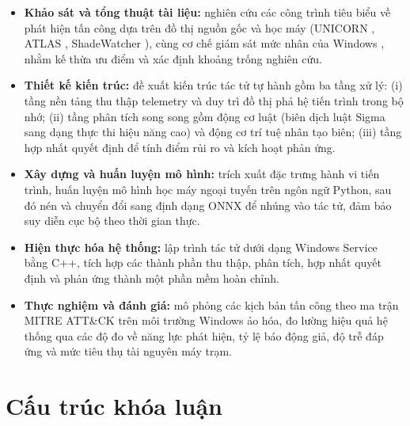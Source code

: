 \begin{itemize}
    \item \textbf{Khảo sát và tổng thuật tài liệu:} nghiên cứu các công trình tiêu biểu về phát hiện tấn công dựa trên đồ thị nguồn gốc và học máy (UNICORN \cite{han2020unicorn}, ATLAS \cite{alsaheel2021atlas}, ShadeWatcher \cite{zeng2022shadewatcher}), cùng cơ chế giám sát mức nhân của Windows \cite{russinovich2021windows}, nhằm kế thừa ưu điểm và xác định khoảng trống nghiên cứu.
    \item \textbf{Thiết kế kiến trúc:} đề xuất kiến trúc tác tử tự hành gồm ba tầng xử lý: (i) tầng nền tảng thu thập telemetry và duy trì đồ thị phả hệ tiến trình trong bộ nhớ; (ii) tầng phân tích song song gồm động cơ luật (biên dịch luật Sigma \cite{sigmahq} sang dạng thực thi hiệu năng cao) và động cơ trí tuệ nhân tạo biên; (iii) tầng hợp nhất quyết định để tính điểm rủi ro và kích hoạt phản ứng.
    \item \textbf{Xây dựng và huấn luyện mô hình:} trích xuất đặc trưng hành vi tiến trình, huấn luyện mô hình học máy ngoại tuyến trên ngôn ngữ Python, sau đó nén và chuyển đổi sang định dạng ONNX để nhúng vào tác tử, đảm bảo suy diễn cục bộ theo thời gian thực.
    \item \textbf{Hiện thực hóa hệ thống:} lập trình tác tử dưới dạng Windows Service bằng C++, tích hợp các thành phần thu thập, phân tích, hợp nhất quyết định và phản ứng thành một phần mềm hoàn chỉnh.
    \item \textbf{Thực nghiệm và đánh giá:} mô phỏng các kịch bản tấn công theo ma trận MITRE ATT\&CK \cite{mitre_attack} trên môi trường Windows ảo hóa, đo lường hiệu quả hệ thống qua các độ đo về năng lực phát hiện, tỷ lệ báo động giả, độ trễ đáp ứng và mức tiêu thụ tài nguyên máy trạm.
\end{itemize}

\section{Cấu trúc khóa luận}
